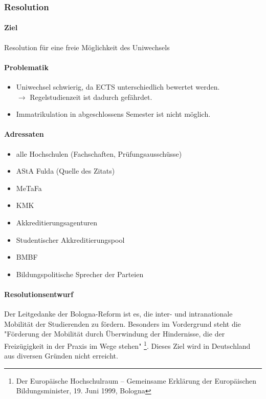     \subsubsection*{Resolution}
      \paragraph{Ziel}
        Resolution für eine freie Möglichkeit des Uniwechsels

      \paragraph{Problematik}
        \begin{itemize}
          \item Uniwechsel schwierig, da ECTS unterschiedlich bewertet werden. \\
             $\rightarrow$ Regelstudienzeit ist dadurch gefährdet.
          \item Immatrikulation in abgeschlossens Semester ist nicht möglich.
        \end{itemize}

      \paragraph{Adressaten}
        \begin{itemize}
          \item alle Hochschulen (Fachschaften, Prüfungsausschüsse)
          \item AStA Fulda (Quelle des Zitats)
          \item MeTaFa
          \item KMK
          \item Akkreditierungsagenturen
          \item Studentischer Akkreditierungspool
          \item BMBF
          \item Bildungspolitische Sprecher der Parteien
        \end{itemize}

      \paragraph{Resolutionsentwurf}
        Der Leitgedanke der Bologna-Reform ist es, die inter- und intranationale Mobilität der Studierenden zu fördern.
        Besonders im Vordergrund steht die "Förderung der Mobilität durch Überwindung der Hindernisse, die der Freizügigkeit in der Praxis im Wege stehen"
        \footnote{Der Europäische Hochschulraum – Gemeinsame Erklärung der Europäischen Bildungsminister, 19. Juni 1999, Bologna}. Dieses Ziel wird in Deutschland aus diversen Gründen nicht erreicht. \\

